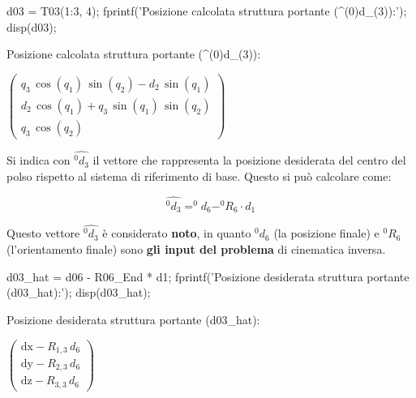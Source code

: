 \documentclass[11pt, a4paper]{article}
\begin{document}
\begin{matlabcode}

d03 = T03(1:3, 4);
fprintf('Posizione calcolata struttura portante (^(0)d_(3)):');
disp(d03);
\end{matlabcode}
\begin{matlaboutput}
Posizione calcolata struttura portante (^(0)d_(3)):
\end{matlaboutput}
\begin{matlabsymbolicoutput}
$\displaystyle \left(\begin{array}{c}
q_3 \,\cos \left(q_1 \right)\,\sin \left(q_2 \right)-d_2 \,\sin \left(q_1 \right)\\
d_2 \,\cos \left(q_1 \right)+q_3 \,\sin \left(q_1 \right)\,\sin \left(q_2 \right)\\
q_3 \,\cos \left(q_2 \right)
\end{array}\right)$
\end{matlabsymbolicoutput}

\newpage
{}

\begin{par}
\begin{flushleft}
Si indica con $\hat{^0 d_3 }$ il vettore che rappresenta la posizione desiderata del centro del polso rispetto al sistema di riferimento di base. Questo si può calcolare come:
\end{flushleft}
\end{par}

\[
    \hat{^0 d_3 } =^0 d_6 -^0 R_6 \cdot d_1
\]

\begin{par}
\begin{flushleft}
Questo vettore $\hat{^0 d_3 }$ è considerato \textbf{noto}, in quanto $^0 d_6$ (la posizione finale) e $^0 R_6$ (l'orientamento finale) sono \textbf{gli input del problema} di cinematica inversa.
\end{flushleft}
\end{par}

\begin{matlabcode}

d03_hat = d06 - R06_End * d1;
fprintf('Posizione desiderata struttura portante (d03_hat):');
disp(d03_hat);
\end{matlabcode}
\begin{matlaboutput}
Posizione desiderata struttura portante (d03_hat):
\end{matlaboutput}
\begin{matlabsymbolicoutput}
$\displaystyle \left(\begin{array}{c}
\textrm{dx}-R_{1,3} \,d_6 \\
\textrm{dy}-R_{2,3} \,d_6 \\
\textrm{dz}-R_{3,3} \,d_6
\end{array}\right)$
\end{matlabsymbolicoutput}
\begin{matlabcode}
\end{matlabcode}
\end{document}

